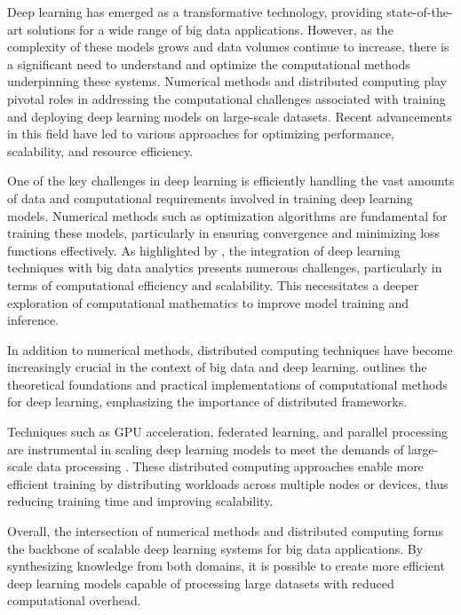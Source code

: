 

Deep learning has emerged as a transformative technology, providing state-of-the-art solutions for a wide range of big data applications.
However, as the complexity of these models grows and data volumes continue to increase, there is a significant need to understand and optimize the computational methods underpinning these systems. Numerical methods and distributed computing play pivotal roles in addressing the computational challenges associated with training and deploying deep learning models on large-scale datasets. Recent advancements in this field have led to various approaches for optimizing performance, scalability, and resource efficiency.

One of the key challenges in deep learning is efficiently handling the vast amounts of data and computational requirements involved in training deep learning models.
Numerical methods such as optimization algorithms are fundamental for training these models, particularly in ensuring convergence and minimizing loss functions effectively.
As highlighted by \citet{najafabadi2015deep}, the integration of deep learning techniques with big data analytics presents numerous challenges, particularly in terms of computational efficiency and scalability. This necessitates a deeper exploration of computational mathematics to improve model training and inference.

In addition to numerical methods, distributed computing techniques have become increasingly crucial in the context of big data and deep learning. \citet{yan2023computational} outlines the theoretical foundations and practical implementations of computational methods for deep learning, emphasizing the importance of distributed frameworks.

Techniques such as GPU acceleration, federated learning, and parallel processing are instrumental in scaling deep learning models to meet the demands of large-scale data processing \citep{dehghani2023distributed}. These distributed computing approaches enable more efficient training by distributing workloads across multiple nodes or devices, thus reducing training time and improving scalability.

Overall, the intersection of numerical methods and distributed computing forms the backbone of scalable deep learning systems for big data applications.
By synthesizing knowledge from both domains, it is possible to create more efficient deep learning models capable of processing large datasets with reduced computational overhead.
